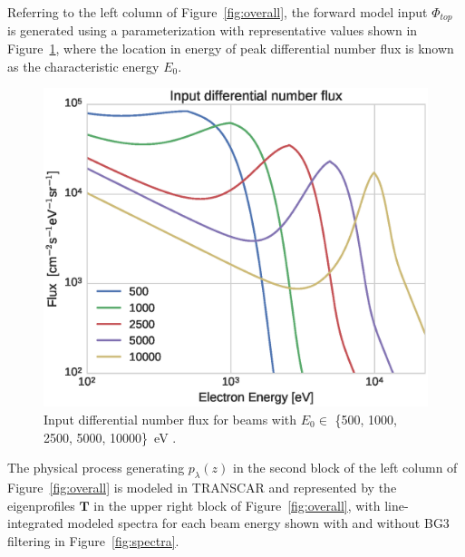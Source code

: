 %


Referring to the left column of Figure~\ref{fig:overall}, the forward model input $\Phi_{top}$ is generated using a parameterization \citep{strickland1993} with representative values shown in Figure~\ref{fig:fwdstrick}, where the location in energy of peak differential number flux is known as the characteristic energy $E_0$.
%
\begin{figure}\centering
    \includegraphics[width=\columnwidth,trim=0 0 50 20,clip]{gfx/hirsc6}
    \caption{Input differential number flux for beams with $E_0\in$ \{500, 1000, 2500, 5000, 10000\}~eV \citep{strickland1993}.}\label{fig:fwdstrick}
\end{figure}
%
The physical process generating $p_\lambda(z)$ in the second block of the left column of Figure~\ref{fig:overall} is modeled in TRANSCAR \citep{zett2007,blelly1996a,lilensten2002} and represented by the eigenprofiles $\mathbf{T}$ in the upper right block of Figure~\ref{fig:overall}, with line-integrated modeled spectra for each beam energy shown with and without BG3 filtering in Figure~\ref{fig:spectra}.
%
%
